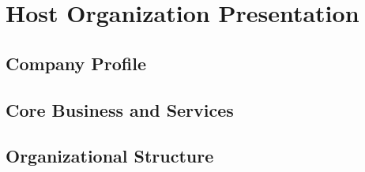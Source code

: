 \section{Host Organization Presentation}

\lipsum[1]

\subsection{Company Profile}

\lipsum[2]

\subsection{Core Business and Services}

\lipsum[3]

\subsection{Organizational Structure}

\lipsum[4]
